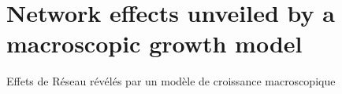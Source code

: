 






\newpage



\section[Unveiling Network Effects][Effets de Réseaux]{Network effects unveiled by a macroscopic growth model}{Effets de Réseau révélés par un modèle de croissance macroscopique}










